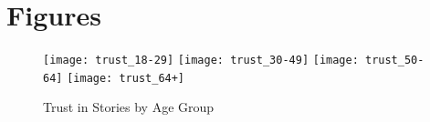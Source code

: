 \chapter{Figures}

\vspace*{-3in}
\newpage


\newpage
\begin{figure}[h!] 
\centering 
  \texttt{[image: trust\_18-29]} 
  \texttt{[image: trust\_30-49]} 
  \texttt{[image: trust\_50-64]} 
  \texttt{[image: trust\_64+]} 
  \caption{Trust in Stories by Age Group
    \label{fig:trust-by-age}}
\end{figure}



\newpage




%  